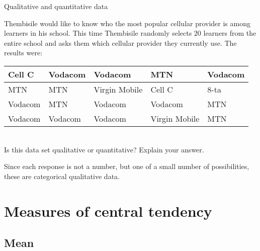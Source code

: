 \begin{wex}{Qualitative and quantitative data}
{Thembisile would like to know who the most popular cellular
  provider is among learners in his school. This time Thembisile
  randomly selects $20$ learners from the entire school and asks them
  which cellular provider they currently use. The results were:

    \begin{center}
      \begin{tabular}{|p{}|p{}|p{}|p{}|p{}|}\hline
        
        Cell C & Vodacom & Vodacom & MTN & Vodacom \\\hline
        MTN & MTN & Virgin Mobile & Cell C & 8-ta \\\hline
        Vodacom & MTN & Vodacom & Vodacom & MTN \\\hline
        Vodacom & Vodacom & Vodacom & Virgin Mobile & MTN \\\hline
      \end{tabular}
    \end{center}
\vspace{8pt}\\
    Is this data set qualitative or quantitative? Explain your answer.
}{
  Since each response is not a number, but one of a small number of
  possibilities, these are categorical qualitative data.
}
\end{wex}

\section{Measures of central tendency}

\subsection{Mean}

